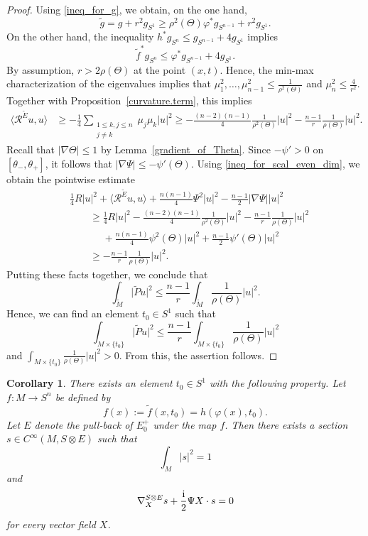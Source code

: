 \documentclass[pdftex]{sigma}
\numberwithin{equation}{section}
\newtheorem{Corollary}[Theorem]{Corollary}
\begin{document}
\begin{proof}
Using \eqref{ineq_for_g}, we obtain, on the one hand,
\[
 \tilde{g} = g + r^2 g_{S^1} \geq \rho^2(\Theta) \varphi^* g_{S^{n-1}} + r^2 g_{S^1}.
 \]
On the other hand, the inequality $h^* g_{S^n} \leq g_{S^{n-1}} + 4 g_{S^1}$ implies
\[
 \tilde{f}^* g_{S^n} \leq \varphi^* g_{S^{n-1}} + 4 g_{S^1}.
\]
By assumption, $r > 2\rho(\Theta)$ at the point $(x,t)$. Hence, the min-max characterization of the eigenvalues implies that $\mu_1^2,\hdots,\mu_{n-1}^2 \leq \frac{1}{\rho^2(\Theta)}$ and $\mu_n^2 \leq \frac{4}{r^2}$.
Together with Proposition~\ref{curvature.term}, this implies
\begin{align*}
\big\langle \mathcal{R}^{\tilde{E}} u,u \big\rangle
&\geq -\frac{1}{4} \sum_{\substack{1\leq k,j\leq n\\ j \neq k}} \mu_j \mu_k |u|^2
\geq -\frac{(n-2)(n-1)}{4} \frac{1}{\rho^2(\Theta)} |u|^2 - \frac{n-1}{r} \frac{1}{\rho(\Theta)} |u|^2.
\end{align*}
Recall that $|\nabla \Theta| \leq 1$ by Lemma~\ref{gradient_of_Theta}.
Since $-\psi' > 0$ on $[\theta_-,\theta_+]$, it follows that $|\nabla \Psi| \leq -\psi'(\Theta)$.
Using \eqref{ineq_for_scal_even_dim}, we obtain the pointwise estimate
\begin{align*}
&\frac{1}{4} R |u|^2 + \big\langle \mathcal{R}^{\tilde{E}} u,u \big\rangle + \frac{n(n-1)}{4} \Psi^2 |u|^2 - \frac{n-1}{2} |\nabla \Psi| |u|^2 \\
&\qquad\geq \frac{1}{4} R |u|^2 - \frac{(n-2)(n-1)}{4} \frac{1}{\rho^2(\Theta)} |u|^2 - \frac{n-1}{r} \frac{1}{\rho(\Theta)} |u|^2\\
&\phantom{\qquad\geq }{}+ \frac{n(n-1)}{4} \psi^2(\Theta) |u|^2 + \frac{n-1}{2} \psi'(\Theta) |u|^2 \\
&\qquad\geq -\frac{n-1}{r} \frac{1}{\rho(\Theta)} |u|^2.
\end{align*}
Putting these facts together, we conclude that
\[
\int_{\tilde{M}} \big|\tilde{P} u\big|^2 \leq \frac{n-1}{r} \int_{\tilde{M}} \frac{1}{\rho(\Theta)} |u|^2.
\]
Hence, we can find an element $t_0 \in S^1$ such that
\[
\int_{M \times \{t_0\}} \big|\tilde{P} u\big|^2 \leq \frac{n-1}{r} \int_{M \times \{t_0\}} \frac{1}{\rho(\Theta)} |u|^2
\]
and $\int_{M \times \{t_0\}} \frac{1}{\rho(\Theta)} |u|^2 > 0$.
From this, the assertion follows.
\end{proof}


\begin{Corollary}
\label{limiting_spinor_even_dim}
There exists an element $t_0 \in S^1$ with the following property.
Let $f\colon M \to S^n$ be defined by
\[
 f(x) := \tilde{f}(x,t_0) = h(\varphi(x) ,t_0).
\]
Let $E$ denote the pull-back of $E_0^+$ under the map $f$.
Then there exists a section $s \in C^\infty(M,S \otimes E)$ such that
\[
 \int_M |s|^2 = 1
\]
and
\[
 \nabla_X^{S \otimes E} s + \frac{\rm i}{2} \Psi X \cdot s = 0
\]
for every vector field $X$.
\end{Corollary}
\end{document}
